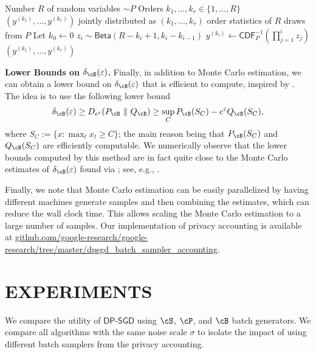 \documentclass[twoside]{article}
\theoremstyle{definition}
\newcommand{\eps}{\varepsilon}
\newcommand{\Deps}{D_{e^{\eps}}}
\newcommand{\DPSGD}{\mathsf{DP}\text{-}\mathsf{SGD}}
\newcommand{\deltaB}{\delta_{\cB}}
\newcommand{\PB}{P_{\cB}}
\newcommand{\QB}{Q_{\cB}}
\newcommand{\CDF}{\mathsf{CDF}}
\newcommand{\Beta}{\mathsf{Beta}}
\begin{document}
\begin{algorithm}[t]
\caption{Sampling Order Statistics of $P$}
\label{alg:order-sampling}
\begin{algorithmic}
\REQUIRE Number $R$ of random variables $\sim P$
\STATE{} Orders $k_1, \ldots, k_r \in \{1, \ldots, R\}$
\ENSURE $(y^{(k_1)}, \ldots, y^{(k_r)})$ jointly distributed as $(k_1, \ldots, k_r)$ order statistics of $R$ draws from $P$ 
\STATE Let $k_0 \gets 0$
    \STATE $z_i \sim \Beta(R-k_i+1, k_i - k_{i-1})$
    \STATE $y^{(k_i)} \gets \CDF_P^{-1}(\prod_{j=1}^i z_j)$
\ENDFOR
\RETURN $(y^{(k_1)}, \ldots, y^{(k_r)})$
\end{algorithmic}
\end{algorithm}

{\bf \boldmath Lower Bounds on $\deltaB(\eps)$.}
Finally, in addition to Monte Carlo estimation, we can obtain a lower bound on $\deltaB(\eps)$ that is efficient to compute, inspired by \cite{chua24private}. The idea is to use the following lower bound\vspace{-2mm}
\begin{align}
\deltaB(\eps) \ge \Deps(\PB ~\|~ \QB) \ge \sup_{C} \PB(S_C) - e^{\eps} \QB(S_C)\label{eq:bnb-lb},%
\end{align}
where $S_C := \{x : \max_t x_t \ge C\}$; the main reason being that $\PB(S_C)$ and $\QB(S_C)$ are efficiently computable. We numerically observe that the lower bounds computed by this method are in fact quite close to the Monte Carlo estimates of $\deltaB(\eps)$ found via ; see, e.g., .

Finally, we note that Monte Carlo estimation can be easily parallelized by having different machines generate samples and then combining the estimates, which can reduce the wall clock time. This allows scaling the Monte Carlo estimation to a large number of samples. Our implementation of privacy accounting is available at \href{https://github.com/google-research/google-research/tree/master/dpsgd_batch_sampler_accounting}{\small github.com/google-research/google-research/tree/master/dpsgd\_batch\_sampler\_accounting}.

\section{EXPERIMENTS}\label{sec:experiments}
\vspace{-2mm}
We compare the utility of $\DPSGD$ using $\cS$, $\cP$, and $\cB$ batch generators.
We compare all algorithms with the same noise scale $\sigma$ to isolate the impact of using different batch samplers from the privacy accounting.
\end{document}

